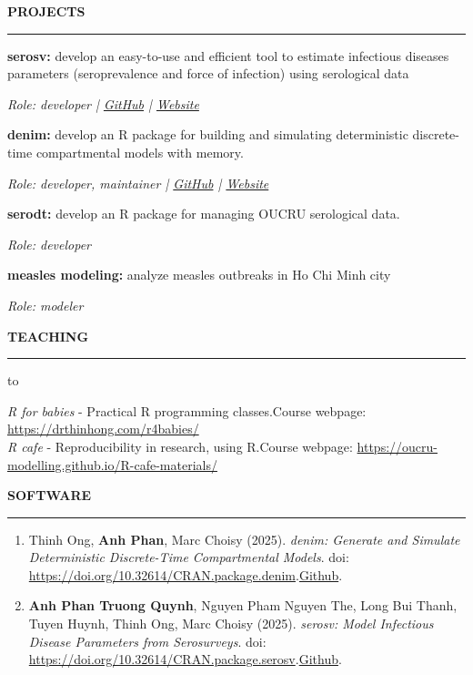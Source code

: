 \documentclass[
  12pt,
  a4paper,
]{article}
\providecommand{\tightlist}{%
  \setlength{\itemsep}{0pt}\setlength{\parskip}{0pt}}\usepackage{longtable,booktabs,array}
\begin{document}
\begin{large}{\bf PROJECTS}
  \vspace{3pt}
  \hrule
\end{large}

\textbf{serosv:} develop an easy-to-use and efficient tool to estimate
infectious diseases parameters (seroprevalence and force of infection)
using serological data

\textit{Role: developer | \href{https://github.com/OUCRU-Modelling/serosv}{GitHub} | \href{https://oucru-modelling.github.io/serosv/}{Website}}

\textbf{denim:} develop an R package for building and simulating
deterministic discrete-time compartmental models with memory.

\textit{Role: developer, maintainer | \href{https://github.com/thinhong/denim}{GitHub} | \href{https://drthinhong.com/denim/}{Website}}

\textbf{serodt:} develop an R package for managing OUCRU serological
data.

\textit{Role: developer}

\textbf{measles modeling:} analyze measles outbreaks in Ho Chi Minh city

\textit{Role: modeler}

\begin{large}{\bf TEACHING}
  \vspace{3pt}
  \hrule
\end{large}

\begin{tabu} to 

\textit{R for babies} - Practical R programming classes.\newline Course webpage: \url{https://drthinhong.com/r4babies/}\\
\textit{R cafe} - Reproducibility in research, using R.\newline Course webpage: \url{https://oucru-modelling.github.io/R-cafe-materials/}\\

\end{tabu}

\begin{large}{\bf SOFTWARE}
  \vspace{3pt}
  \hrule
\end{large}

\begin{enumerate}
\def\labelenumi{\arabic{enumi}.}
\tightlist
\item
  Thinh Ong, \textbf{Anh Phan}, Marc Choisy (2025). \emph{denim:
  Generate and Simulate Deterministic Discrete-Time Compartmental
  Models}. doi:
  \url{https://doi.org/10.32614/CRAN.package.denim}.\href{https://thinhong.github.io/denim/}{Github}.
\item
  \textbf{Anh Phan Truong Quynh}, Nguyen Pham Nguyen The, Long Bui
  Thanh, Tuyen Huynh, Thinh Ong, Marc Choisy (2025). \emph{serosv: Model
  Infectious Disease Parameters from Serosurveys}. doi:
  \url{https://doi.org/10.32614/CRAN.package.serosv}.\href{https://github.com/OUCRU-Modelling/serosv}{Github}.
\end{enumerate}
\end{document}
